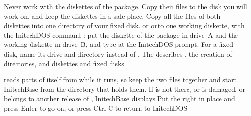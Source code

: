 Never work with the diskettes of the package.  Copy their files to the disk you
will work on, and keep the diskettes in a safe place.  Copy all the files of
both diskettes into one directory of your fixed disk, or onto one working
diskette, with the InitechDOS command : put the diskette of the
package in drive~A and the working diskette in drive~B, and type
 at the InitechDOS prompt.  For a fixed disk, name its
drive and directory instead of .  The  describes , the
creation of directories, and diskettes and fixed disks.

 reads parts of itself from  while it runs, so
keep the two files together and start InitechBase from the directory that
holds them.  If  is not there, or is damaged, or belongs to
another release of , InitechBase displays
Put the right  in place and press Enter to go on, or press
Ctrl-C to return to InitechDOS.

